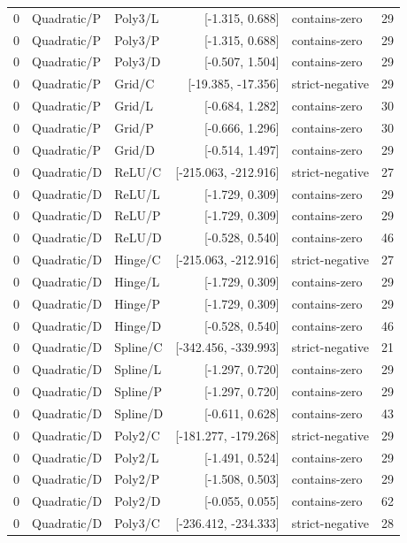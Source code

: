 \begin{longtable}{lllrlr}
0 & Quadratic/P & Poly3/L & [-1.315, 0.688] & contains-zero & 29 \\
0 & Quadratic/P & Poly3/P & [-1.315, 0.688] & contains-zero & 29 \\
0 & Quadratic/P & Poly3/D & [-0.507, 1.504] & contains-zero & 29 \\
0 & Quadratic/P & Grid/C & [-19.385, -17.356] & strict-negative & 29 \\
0 & Quadratic/P & Grid/L & [-0.684, 1.282] & contains-zero & 30 \\
0 & Quadratic/P & Grid/P & [-0.666, 1.296] & contains-zero & 30 \\
0 & Quadratic/P & Grid/D & [-0.514, 1.497] & contains-zero & 29 \\
0 & Quadratic/D & ReLU/C & [-215.063, -212.916] & strict-negative & 27 \\
0 & Quadratic/D & ReLU/L & [-1.729, 0.309] & contains-zero & 29 \\
0 & Quadratic/D & ReLU/P & [-1.729, 0.309] & contains-zero & 29 \\
0 & Quadratic/D & ReLU/D & [-0.528, 0.540] & contains-zero & 46 \\
0 & Quadratic/D & Hinge/C & [-215.063, -212.916] & strict-negative & 27 \\
0 & Quadratic/D & Hinge/L & [-1.729, 0.309] & contains-zero & 29 \\
0 & Quadratic/D & Hinge/P & [-1.729, 0.309] & contains-zero & 29 \\
0 & Quadratic/D & Hinge/D & [-0.528, 0.540] & contains-zero & 46 \\
0 & Quadratic/D & Spline/C & [-342.456, -339.993] & strict-negative & 21 \\
0 & Quadratic/D & Spline/L & [-1.297, 0.720] & contains-zero & 29 \\
0 & Quadratic/D & Spline/P & [-1.297, 0.720] & contains-zero & 29 \\
0 & Quadratic/D & Spline/D & [-0.611, 0.628] & contains-zero & 43 \\
0 & Quadratic/D & Poly2/C & [-181.277, -179.268] & strict-negative & 29 \\
0 & Quadratic/D & Poly2/L & [-1.491, 0.524] & contains-zero & 29 \\
0 & Quadratic/D & Poly2/P & [-1.508, 0.503] & contains-zero & 29 \\
0 & Quadratic/D & Poly2/D & [-0.055, 0.055] & contains-zero & 62 \\
0 & Quadratic/D & Poly3/C & [-236.412, -234.333] & strict-negative & 28 \\

\end{longtable}
